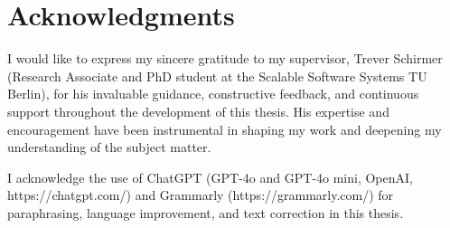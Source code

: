\documentclass[a4paper, 11pt]{article}
\begin{document}
\newpage

\section*{Acknowledgments}
I would like to express my sincere gratitude to my supervisor, Trever Schirmer (Research Associate and PhD student at the Scalable Software Systems TU Berlin), for his invaluable guidance, constructive feedback, and continuous support throughout the development of this thesis. His expertise and encouragement have been instrumental in shaping my work and deepening my understanding of the subject matter.

I acknowledge the use of ChatGPT (GPT-4o and GPT-4o mini, OpenAI, https://chatgpt.com/) and Grammarly (https://grammarly.com/) for paraphrasing, language improvement, and text correction in this thesis.

\clearpage

\tableofcontents


\clearpage

\clearpage

\clearpage

\clearpage

\clearpage

\clearpage

\clearpage


\newpage
\printbibliography
\end{document}

